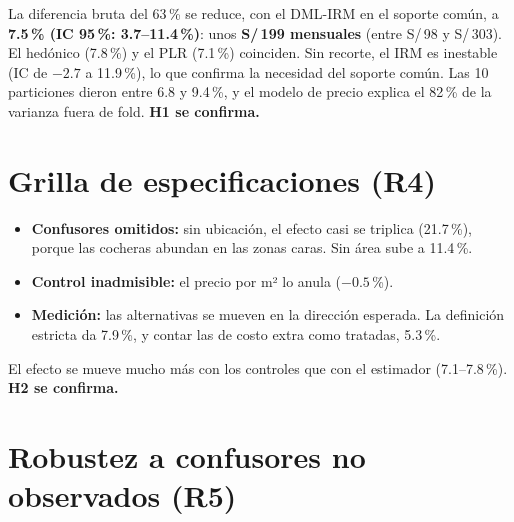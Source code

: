 \begin{table}[H]
\centering\footnotesize
\caption{Efecto de tener cochera incluida sobre el precio de oferta (R3). EE agrupados por edificio}\label{tab:principal_c}
\resizebox{\textwidth}{!}{}
\end{table}

La diferencia bruta del 63\,\% se reduce, con el DML-IRM en el soporte común, a \textbf{7.5\,\% (IC 95\,\%: 3.7--11.4\,\%)}: unos \textbf{S/\,199 mensuales} (entre S/\,98 y S/\,303). El hedónico (7.8\,\%) y el PLR (7.1\,\%) coinciden. Sin recorte, el IRM es inestable (IC de $-2.7$ a 11.9\,\%), lo que confirma la necesidad del soporte común. Las 10 particiones dieron entre 6.8 y 9.4\,\%, y el modelo de precio explica el 82\,\% de la varianza fuera de fold. \textbf{H1 se confirma.}

\section{Grilla de especificaciones (R4)}\label{sec:res_grilla}

\begin{table}[H]
\centering\scriptsize
\caption{Efecto de la cochera bajo cada especificación (R4). DML-IRM, soporte común}\label{tab:especificaciones_c}
\resizebox{\textwidth}{!}{}
\end{table}

\begin{itemize}[itemsep=1pt]
\item \textbf{Confusores omitidos:} sin ubicación, el efecto casi se triplica (21.7\,\%), porque las cocheras abundan en las zonas caras. Sin área sube a 11.4\,\%.
\item \textbf{Control inadmisible:} el precio por m² lo anula ($-0.5$\,\%).
\item \textbf{Medición:} las alternativas se mueven en la dirección esperada. La definición estricta da 7.9\,\%, y contar las de costo extra como tratadas, 5.3\,\%.
\end{itemize}
El efecto se mueve mucho más con los controles que con el estimador (7.1--7.8\,\%). \textbf{H2 se confirma.}

\section{Robustez a confusores no observados (R5)}\label{sec:res_sens}

